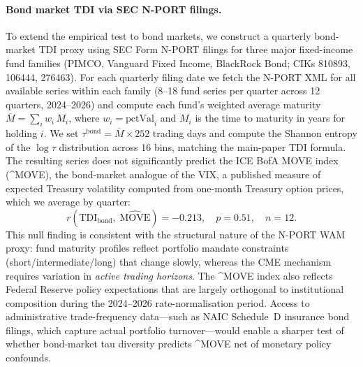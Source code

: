 \documentclass[preprint,12pt,authoryear]{elsarticle}
\begin{document}
\paragraph{Bond market TDI via SEC N-PORT filings.}
To extend the empirical test to bond markets, we construct a quarterly
bond-market TDI proxy using SEC Form N-PORT filings for three major
fixed-income fund families (PIMCO, Vanguard Fixed Income, BlackRock Bond;
CIKs 810893, 106444, 276463).
For each quarterly filing date we fetch the N-PORT XML for all available
series within each family (8--18 fund series per quarter across 12 quarters,
2024--2026) and compute each fund's weighted average maturity
$\overline{M} = \sum_i w_i\,M_i$, where $w_i = \text{pctVal}_i$ and $M_i$
is the time to maturity in years for holding $i$.
We set $\tau^{\text{bond}} = \overline{M} \times 252$ trading days and compute
the Shannon entropy of the $\log\tau$ distribution across 16 bins,
matching the main-paper TDI formula.
The resulting series does not significantly predict the ICE BofA MOVE index
(\textasciicircum{}MOVE), the bond-market analogue of the VIX, a published
measure of expected Treasury volatility computed from one-month Treasury
option prices, which we average by quarter:
\[
  r(\mathrm{TDI}_{\text{bond}},\;\widehat{\text{MOVE}}) = -0.213,
  \quad p = 0.51, \quad n = 12.
\]
This null finding is consistent with the structural nature of the N-PORT
WAM proxy: fund maturity profiles reflect portfolio mandate constraints
(short/intermediate/long) that change slowly, whereas the CME mechanism
requires variation in \emph{active trading horizons}.
The \textasciicircum{}MOVE index also reflects Federal Reserve policy
expectations that are largely orthogonal to institutional composition
during the 2024--2026 rate-normalisation period.
Access to administrative trade-frequency data---such as NAIC Schedule~D
insurance bond filings, which capture actual portfolio turnover---would
enable a sharper test of whether bond-market tau diversity predicts
\textasciicircum{}MOVE net of monetary policy confounds.
\end{document}

